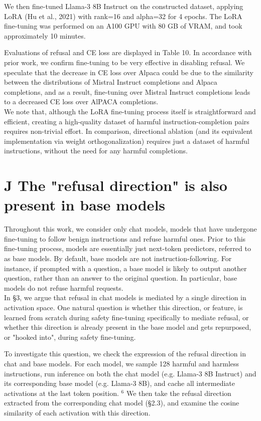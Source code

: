 \documentclass[10pt]{article}
\begin{document}
We then fine-tuned Llama-3 8B Instruct on the constructed dataset, applying LoRA (Hu et al., 2021) with rank=16 and alpha=32 for 4 epochs. The LoRA fine-tuning was performed on an A100 GPU with 80 GB of VRAM, and took approximately 10 minutes.

Evaluations of refusal and CE loss are displayed in Table 10. In accordance with prior work, we confirm fine-tuning to be very effective in disabling refusal. We speculate that the decrease in CE loss over Alpaca could be due to the similarity between the distributions of Mistral Instruct completions and Alpaca completions, and as a result, fine-tuning over Mistral Instruct completions leads to a decreased CE loss over AlPACA completions.\\
We note that, although the LoRA fine-tuning process itself is straightforward and efficient, creating a high-quality dataset of harmful instruction-completion pairs requires non-trivial effort. In comparison, directional ablation (and its equivalent implementation via weight orthogonalization) requires just a dataset of harmful instructions, without the need for any harmful completions.

\section*{J The "refusal direction" is also present in base models}
Throughout this work, we consider only chat models, models that have undergone fine-tuning to follow benign instructions and refuse harmful ones. Prior to this fine-tuning process, models are essentially just next-token predictors, referred to as base models. By default, base models are not instruction-following. For instance, if prompted with a question, a base model is likely to output another question, rather than an answer to the original question. In particular, base models do not refuse harmful requests.\\
In §3, we argue that refusal in chat models is mediated by a single direction in activation space. One natural question is whether this direction, or feature, is learned from scratch during safety fine-tuning specifically to mediate refusal, or whether this direction is already present in the base model and gets repurposed, or "hooked into", during safety fine-tuning.

To investigate this question, we check the expression of the refusal direction in chat and base models. For each model, we sample 128 harmful and harmless instructions, run inference on both the chat model (e.g. Llama-3 8B Instruct) and its corresponding base model (e.g. Llama-3 8B), and cache all intermediate activations at the last token position. ${ }^{6}$ We then take the refusal direction extracted from the corresponding chat model (§2.3), and examine the cosine similarity of each activation with this direction.
\end{document}
